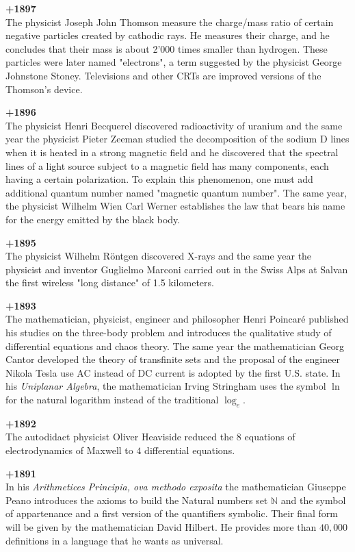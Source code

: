 \textbf{+1897}\\
The physicist Joseph John Thomson measure the charge/mass ratio of certain negative particles created by cathodic rays. He measures their charge, and he concludes that their mass is about 2'000 times smaller than hydrogen. These particles were later named "electrons", a term suggested by the physicist George Johnstone Stoney. Televisions and other CRTs are improved versions of the Thomson's device.

\textbf{+1896}\\
The physicist Henri Becquerel discovered radioactivity of uranium and the same year the physicist Pieter Zeeman studied the decomposition of the sodium D lines when it is heated in a strong magnetic field and he discovered that the spectral lines of a light source subject to a magnetic field has many components, each having a certain polarization. To explain this phenomenon, one must add additional quantum number named "magnetic quantum number". The same year, the physicist Wilhelm Wien Carl Werner establishes the law that bears his name for the energy emitted by the black body.

\textbf{+1895}\\
The physicist Wilhelm Röntgen discovered X-rays and the same year the physicist and inventor Guglielmo Marconi carried out in the Swiss Alps at Salvan the first wireless "long distance" of 1.5 kilometers.

\textbf{+1893}\\
The mathematician, physicist, engineer and philosopher Henri Poincaré published his studies on the three-body problem and introduces the qualitative study of differential equations and chaos theory. The same year the mathematician Georg Cantor developed the theory of transfinite sets and the proposal of the engineer Nikola Tesla use AC instead of DC current is adopted by the first U.S. state. In his \textit{Uniplanar Algebra}, the mathematician Irving Stringham uses the symbol $\ln$ for the natural logarithm instead of the traditional $\log_e$.

\textbf{+1892}\\
The autodidact physicist Oliver Heaviside reduced the 8 equations of electrodynamics of Maxwell to $4$ differential equations. 

\textbf{+1891}\\
In his \textit{Arithmetices Principia, ova methodo exposita} the mathematician Giuseppe Peano introduces the axioms to build the Natural numbers set $\mathbb{N}$ and the symbol of appartenance and a first version of the quantifiers symbolic. Their final form will be given by the mathematician David Hilbert. He provides more than $40,000$ definitions in a language that he wants as universal.

